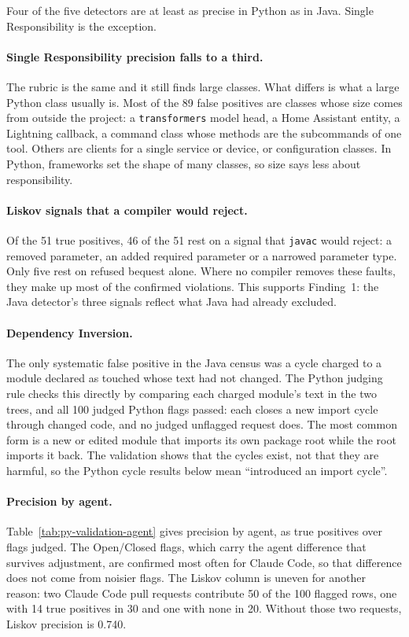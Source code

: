 Four of the five detectors are at least as precise in Python as in Java. Single Responsibility is the
exception.

\paragraph{Single Responsibility precision falls to a third.} The rubric is the same and it still
finds large classes. What differs is what a large Python class usually is. Most of the 89 false
positives are classes whose size comes from outside the project: a \texttt{transformers} model head,
a Home Assistant entity, a Lightning callback, a command class whose methods are the subcommands of
one tool. Others are clients for a single service or device, or configuration classes. In Python,
frameworks set the shape of many classes, so size says less about responsibility.

\paragraph{Liskov signals that a compiler would reject.} Of the 51 true positives, 46 of the 51 rest
on a signal that \texttt{javac} would reject: a removed parameter, an added required parameter or a
narrowed parameter type. Only five rest on refused bequest alone. Where no compiler removes these
faults, they make up most of the confirmed violations. This supports Finding~1: the Java detector's
three signals reflect what Java had already excluded.

\paragraph{Dependency Inversion.} The only systematic false positive in the Java census was a cycle
charged to a module declared as touched whose text had not changed. The Python judging rule checks
this directly by comparing each charged module's text in the two trees, and all 100 judged Python
flags passed: each closes a new import cycle through changed code, and no judged unflagged request
does. The most common form is a new or edited module that imports its own package root while the
root imports it back. The validation shows that the cycles exist, not that they are harmful, so the
Python cycle results below mean ``introduced an import cycle''.

\paragraph{Precision by agent.} Table~\ref{tab:py-validation-agent} gives precision by agent, as true
positives over flags judged. The
Open/Closed flags, which carry the agent difference that survives adjustment, are confirmed most
often for Claude Code, so that difference does not come from noisier flags. The Liskov column is
uneven for another reason: two Claude Code pull requests contribute 50 of the 100 flagged rows, one
with 14 true positives in 30 and one with none in 20. Without those two requests, Liskov precision is
0.740.

